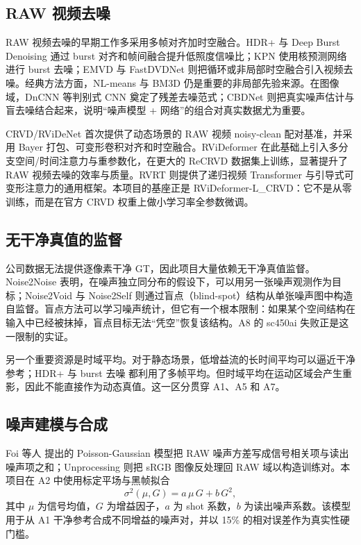\documentclass[11pt,a4paper,UTF8,fontset=fandol]{ctexart}
\begin{document}
\subsection{RAW 视频去噪}

RAW 视频去噪的早期工作多采用多帧对齐加时空融合。HDR+\cite{r10} 与 Deep Burst Denoising\cite{r9} 通过 burst 对齐和帧间融合提升低照度信噪比；KPN\cite{r17} 使用核预测网络进行 burst 去噪；EMVD\cite{r15} 与 FastDVDNet\cite{r16} 则把循环或非局部时空融合引入视频去噪。经典方法方面，NL-means\cite{r18} 与 BM3D\cite{r19} 仍是重要的非局部先验来源。在图像域，DnCNN\cite{r14} 等判别式 CNN 奠定了残差去噪范式；CBDNet\cite{r20} 则把真实噪声估计与盲去噪结合起来，说明“噪声模型 + 网络”的组合对真实数据尤为重要。

CRVD/RViDeNet\cite{r1} 首次提供了动态场景的 RAW 视频 noisy-clean 配对基准，并采用 Bayer 打包、可变形卷积对齐和时空融合。RViDeformer\cite{r2} 在此基础上引入多分支空间/时间注意力与重参数化，在更大的 ReCRVD 数据集上训练，显著提升了 RAW 视频去噪的效率与质量。RVRT\cite{r3} 则提供了递归视频 Transformer 与引导式可变形注意力的通用框架。本项目的基座正是 RViDeformer-L\_CRVD：它不是从零训练，而是在官方 CRVD 权重上做小学习率全参数微调。

\subsection{无干净真值的监督}

公司数据无法提供逐像素干净 GT，因此项目大量依赖无干净真值监督。Noise2Noise\cite{r4} 表明，在噪声独立同分布的假设下，可以用另一张噪声观测作为目标；Noise2Void\cite{r5} 与 Noise2Self\cite{r6} 则通过盲点（blind-spot）结构从单张噪声图中构造自监督。盲点方法可以学习噪声统计，但它有一个根本限制：如果某个空间结构在输入中已经被抹掉，盲点目标无法“凭空”恢复该结构。A8 的 sc450ai 失败正是这一限制的实证。

另一个重要资源是时域平均。对于静态场景，低增益流的长时间平均可以逼近干净参考；HDR+\cite{r10} 与 burst 去噪\cite{r9,r17} 都利用了多帧平均。但时域平均在运动区域会产生重影，因此不能直接作为动态真值。这一区分贯穿 A1、A5 和 A7。

\subsection{噪声建模与合成}

Foi 等人\cite{r7} 提出的 Poisson-Gaussian 模型把 RAW 噪声方差写成信号相关项与读出噪声项之和；Unprocessing\cite{r8} 则把 sRGB 图像反处理回 RAW 域以构造训练对。本项目在 A2 中使用标定平场与黑帧拟合
\begin{equation}
\sigma^2(\mu,G)=a\,\mu\,G+b\,G^2,
\label{eq:noise}
\end{equation}
其中 $\mu$ 为信号均值，$G$ 为增益因子，$a$ 为 shot 系数，$b$ 为读出噪声系数。该模型用于从 A1 干净参考合成不同增益的噪声对，并以 15\% 的相对误差作为真实性硬门槛。
\end{document}
